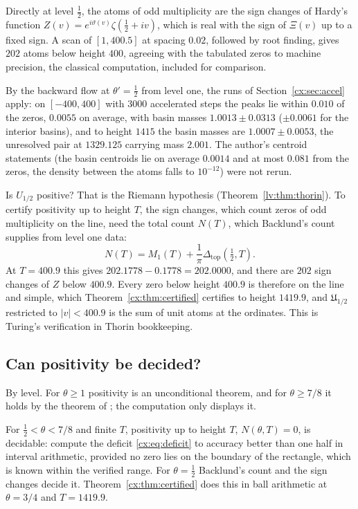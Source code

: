 Directly at level $\tfrac12$, the atoms of odd multiplicity are the sign changes of Hardy's function $Z(v)=e^{i\vartheta(v)}\zeta(\tfrac12+iv)$, which is real with the sign of $\Xi(v)$ up to a fixed sign. A scan of $[1,400.5]$ at spacing $0.02$, followed by root finding, gives $202$ atoms below height $400$, agreeing with the tabulated zeros to machine precision, the classical computation, included for comparison.

By the backward flow at $\theta'=\tfrac12$ from level one, the runs of Section~\ref{cx:sec:accel} apply: on $[-400,400]$ with $3000$ accelerated steps the peaks lie within $0.010$ of the zeros, $0.0055$ on average, with basin masses $1.0013\pm0.0313$ ($\pm0.0061$ for the interior basins), and to height $1415$ the basin masses are $1.0007\pm0.0053$, the unresolved pair at $1329.125$ carrying mass $2.001$. The author's centroid statements (the basin centroids lie on average $0.0014$ and at most $0.081$ from the zeros, the density between the atoms falls to $10^{-12}$) were not rerun.

Is $U_{1/2}$ positive? That is the Riemann hypothesis (Theorem~\ref{lv:thm:thorin}). To certify positivity up to height $T$, the sign changes, which count zeros of odd multiplicity on the line, need the total count $N(T)$, which Backlund's count supplies from level one data:
\[
N(T)=M_1(T)+\frac1\pi\Delta_{\mathrm{top}}(\tfrac12,T).
\]
At $T=400.9$ this gives $202.1778-0.1778=202.0000$, and there are $202$ sign changes of $Z$ below $400.9$. Every zero below height $400.9$ is therefore on the line and simple, which Theorem~\ref{cx:thm:certified} certifies to height $1419.9$, and $\mathfrak U_{1/2}$ restricted to $|v|<400.9$ is the sum of unit atoms at the ordinates. This is Turing's verification \cite{Turing53} in Thorin bookkeeping.

\subsection{Can positivity be decided?}\label{cx:sec:decide}

By level. For $\theta\ge1$ positivity is an unconditional theorem, and for $\theta\ge7/8$ it holds by the theorem of \cite{OAI26a}; the computation only displays it.

For $\tfrac12<\theta<7/8$ and finite $T$, positivity up to height $T$, $N(\theta,T)=0$, is decidable: compute the deficit \eqref{cx:eq:deficit} to accuracy better than one half in interval arithmetic, provided no zero lies on the boundary of the rectangle, which is known within the verified range. For $\theta=\tfrac12$ Backlund's count and the sign changes decide it. Theorem~\ref{cx:thm:certified} does this in ball arithmetic at $\theta=3/4$ and $T=1419.9$.


